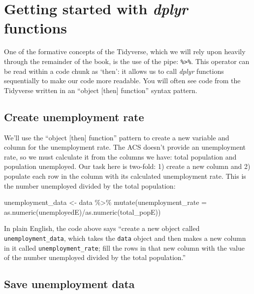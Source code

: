 \documentclass[
  krantz2]{krantz}
\makeatletter
\newenvironment{Shaded}{\begin{snugshade}}{\end{snugshade}}
\newcommand{\AttributeTok}[1]{\textcolor[rgb]{0.61,0.61,0.61}{#1}}
\newcommand{\FunctionTok}[1]{\textcolor[rgb]{0,0,0}{#1}}
\newcommand{\NormalTok}[1]{#1}
\newcommand{\OtherTok}[1]{\textcolor[rgb]{0.37,0.37,0.37}{#1}}
\newcommand{\SpecialCharTok}[1]{\textcolor[rgb]{0,0,0}{#1}}
\newenvironment{kframe}{%
\medskip{}
\setlength{\fboxsep}{.8em}
 \def\at@end@of@kframe{}%
 \ifinner\ifhmode%
  \def\at@end@of@kframe{\end{minipage}}%
  \begin{minipage}{\columnwidth}%
 \fi\fi%
 \def\FrameCommand##1{\hskip\@totalleftmargin \hskip-\fboxsep
 \colorbox{shadecolor}{##1}\hskip-\fboxsep
     \hskip-\linewidth \hskip-\@totalleftmargin \hskip\columnwidth}%
 \MakeFramed {\advance\hsize-\width
   \@totalleftmargin\z@ \linewidth\hsize
   \@setminipage}}%
 {\par\unskip\endMakeFramed%
 \at@end@of@kframe}
\renewenvironment{Shaded}{\begin{kframe}}{\end{kframe}}
\makeatother
\begin{document}
\hypertarget{dplyr-start}{%
\section{\texorpdfstring{Getting started with \emph{dplyr} functions}{Getting started with dplyr functions}}\label{dplyr-start}}

One of the formative concepts of the Tidyverse, which we will rely upon heavily through the remainder of the book, is the use of the pipe: \texttt{\%\textgreater{}\%}. This operator can be read within a code chunk as `then': it allows us to call \emph{dplyr} functions sequentially to make our code more readable. You will often see code from the Tidyverse written in an ``object {[}then{]} function'' syntax pattern.

\hypertarget{create-unemployment-rate}{%
\subsection{Create unemployment rate}\label{create-unemployment-rate}}

We'll use the ``object {[}then{]} function'' pattern to create a new variable and column for the unemployment rate. The ACS doesn't provide an unemployment rate, so we must calculate it from the columns we have: total population and population unemployed. Our task here is two-fold: 1) create a new column and 2) populate each row in the column with its calculated unemployment rate. This is the number unemployed divided by the total population:

\begin{Shaded}
\begin{Highlighting}[]
\NormalTok{unemployment\_data }\OtherTok{\textless{}{-}}\NormalTok{ data }\SpecialCharTok{\%\textgreater{}\%}
  \FunctionTok{mutate}\NormalTok{(}\AttributeTok{unemployment\_rate =} \FunctionTok{as.numeric}\NormalTok{(unemployedE)}\SpecialCharTok{/}\FunctionTok{as.numeric}\NormalTok{(total\_popE)) }
\end{Highlighting}
\end{Shaded}

In plain English, the code above says ``create a new object called \texttt{unemployment\_data}, which takes the \texttt{data} object and then makes a new column in it called \texttt{unemployment\_rate}; fill the rows in that new column with the value of the number unemployed divided by the total population.''

\hypertarget{save-unemployment-data}{%
\subsection{Save unemployment data}\label{save-unemployment-data}}
\end{document}
